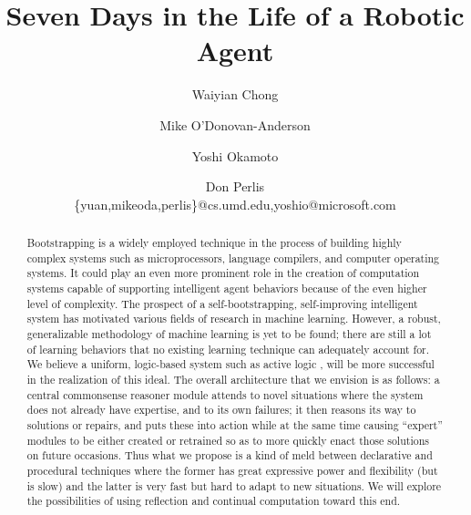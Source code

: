\documentclass{llncs}
\begin{document}

\title{Seven Days in the Life of a Robotic Agent}


\author{Waiyian Chong \and Mike O'Donovan-Anderson \and
  Yoshi Okamoto \and Don Perlis\\
  \{yuan,mikeoda,perlis\}@cs.umd.edu,yoshio@microsoft.com}


\maketitle

%
%


\begin{abstract}
  Bootstrapping is a widely employed technique in the process of building
  highly complex systems such as microprocessors, language compilers, and
  computer operating systems.  It could play an even more prominent role in
  the creation of computation systems capable of supporting intelligent
  agent behaviors because of the even higher level of complexity.  The
  prospect of a self-bootstrapping, self-improving intelligent system has
  motivated various fields of research in machine learning.  However, a
  robust, generalizable methodology of machine learning is yet to be found;
  there are still a lot of learning behaviors that no existing learning
  technique can adequately account for.  We believe a uniform, logic-based
  system such as active logic
  \cite{elgot-drapkin/perlis:reasoning:jetai,elgot-drapkin/kraus/miller/nirkhe/perlis1996:active_logics},
  will be more successful in the realization of this ideal.  The overall
  architecture that we envision is as follows: a central commonsense
  reasoner module attends to novel situations where the system does not
  already have expertise, and to its own failures; it then reasons its way
  to solutions or repairs, and puts these into action while at the same
  time causing {}``expert'' modules to be either created or retrained so as
  to more quickly enact those solutions on future occasions.  Thus what we
  propose is a kind of meld between declarative and procedural techniques
  where the former has great expressive power and flexibility (but is slow)
  and the latter is very fast but hard to adapt to new situations.  We will
  explore the possibilities of using reflection and continual computation
  toward this end.
\end{abstract}
\end{document}
